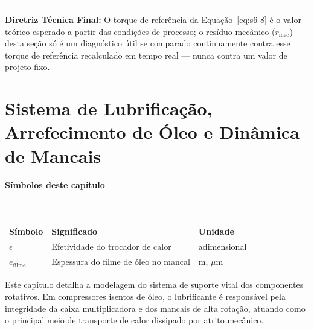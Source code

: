 \documentclass[12pt,a4paper]{article}
\numberwithin{equation}{section}
\numberwithin{table}{section}
\numberwithin{figure}{section}
\begin{document}
{	\vspace{1em}
	\hrule
	\vspace{1em}

	\textbf{Diretriz Técnica Final:} O torque de referência da Equação~\eqref{eq:s6-8} é o valor teórico esperado a partir das condições de processo; o resíduo mecânico ($r_{\text{mec}}$) desta seção só é um diagnóstico útil se comparado continuamente contra esse torque de referência recalculado em tempo real — nunca contra um valor de projeto fixo.

	
	
	\clearpage
	\section{\textbf{Sistema de Lubrificação, Arrefecimento de Óleo e Dinâmica de Mancais}}

\paragraph{Símbolos deste capítulo}\mbox{}\\[-0.5em]
{\small
\begin{longtable}{>{\raggedright\arraybackslash}p{2.6cm} >{\raggedright\arraybackslash}p{9.2cm} >{\raggedright\arraybackslash}p{2.6cm}}
	\toprule
	\textbf{Símbolo} & \textbf{Significado} & \textbf{Unidade} \\ \midrule
	\endhead
	$\epsilon$ & Efetividade do trocador de calor & adimensional \\
	$e_{\text{filme}}$\dag & Espessura do filme de óleo no mancal & m, $\mu$m \\
	\bottomrule
\end{longtable}
}




	
	Este capítulo detalha a modelagem do sistema de suporte vital dos componentes rotativos. Em compressores isentos de óleo, o lubrificante é responsável pela integridade da caixa multiplicadora e dos mancais de alta rotação, atuando como o principal meio de transporte de calor dissipado por atrito mecânico.
	
}
\end{document}
